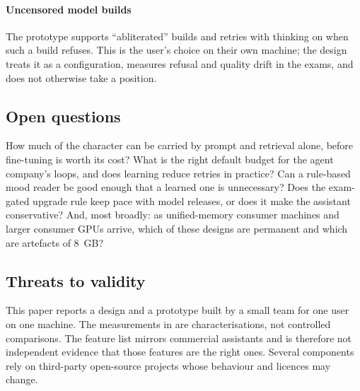 \paragraph{Uncensored model builds} The prototype supports ``abliterated'' builds and retries with thinking on when such a build refuses. This is the user's choice on their own machine; the design treats it as a configuration, measures refusal and quality drift in the exams, and does not otherwise take a position.

\subsection{Open questions}

How much of the character can be carried by prompt and retrieval alone, before fine-tuning is worth its cost? What is the right default budget for the agent company's loops, and does  learning reduce retries in practice? Can a rule-based mood reader be good enough that a learned one is unnecessary? Does the exam-gated upgrade rule keep pace with model releases, or does it make the assistant conservative? And, most broadly: as unified-memory consumer machines and larger consumer GPUs arrive, which of these designs are permanent and which are artefacts of 8~GB?

\subsection{Threats to validity}

This paper reports a design and a prototype built by a small team for one user on one machine. The measurements in  are characterisations, not controlled comparisons. The feature list mirrors commercial assistants and is therefore not independent evidence that those features are the right ones. Several components rely on third-party open-source projects whose behaviour and licences may change.
